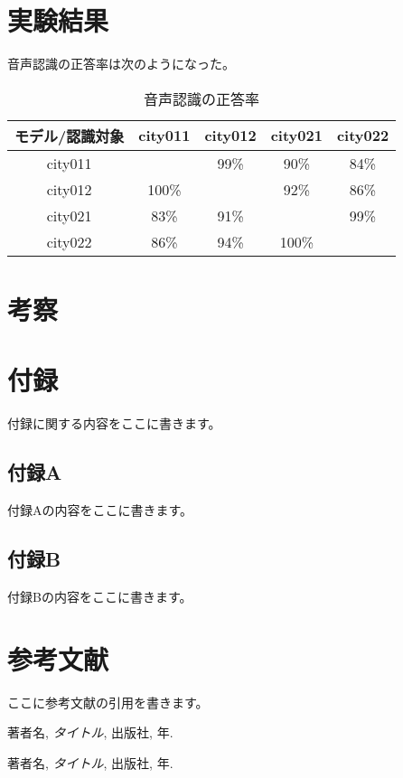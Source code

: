 \documentclass[a4paper,12pt]{article}
\begin{document}
\section{実験結果}
音声認識の正答率は次のようになった。

\begin{table}[htbp]
    \centering
    \begin{tabular}{|c|c|c|c|c|}
      \hline
      モデル/認識対象 & city011 & city012 & city021 & city022 \\
      \hline
      city011 &       & 99\% & 90\%  & 84\% \\
      \hline
      city012 & 100\% &      & 92\%  & 86\% \\
      \hline
      city021 & 83\%  & 91\% &       & 99\% \\
      \hline
      city022 & 86\% &  94\% & 100\%  &      \\
      \hline
    \end{tabular}
    \caption{音声認識の正答率}
    \label{tab:音声認識の正答率}
  \end{table}

\section{考察}

\appendix
\section{付録}
付録に関する内容をここに書きます。

\subsection{付録A}
付録Aの内容をここに書きます。

\subsection{付録B}
付録Bの内容をここに書きます。

\newpage

\section*{参考文献}

ここに参考文献の引用を書きます。

\begin{thebibliography}{9}
  著者名,
  \textit{タイトル},
  出版社,
  年.
  
  著者名,
  \textit{タイトル},
  出版社,
  年.
\end{thebibliography}
\end{document}
